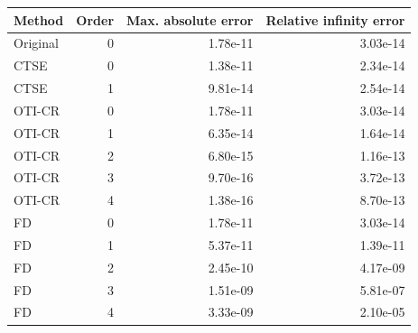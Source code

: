 \begin{center}\begin{tabular}{lrrr}\toprule
Method & Order & Max. absolute error & Relative infinity error \\ \midrule
Original & 0 & 1.78e-11 & 3.03e-14 \\
CTSE & 0 & 1.38e-11 & 2.34e-14 \\
CTSE & 1 & 9.81e-14 & 2.54e-14 \\
OTI-CR & 0 & 1.78e-11 & 3.03e-14 \\
OTI-CR & 1 & 6.35e-14 & 1.64e-14 \\
OTI-CR & 2 & 6.80e-15 & 1.16e-13 \\
OTI-CR & 3 & 9.70e-16 & 3.72e-13 \\
OTI-CR & 4 & 1.38e-16 & 8.70e-13 \\
FD & 0 & 1.78e-11 & 3.03e-14 \\
FD & 1 & 5.37e-11 & 1.39e-11 \\
FD & 2 & 2.45e-10 & 4.17e-09 \\
FD & 3 & 1.51e-09 & 5.81e-07 \\
FD & 4 & 3.33e-09 & 2.10e-05 \\
\bottomrule\end{tabular}\end{center}
